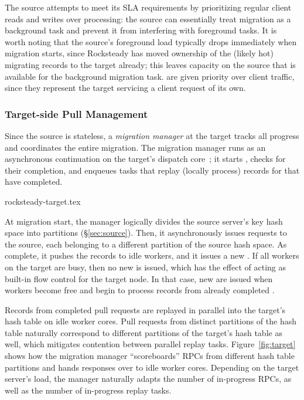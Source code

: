 The source attempts to meet its SLA requirements by prioritizing regular client
reads and writes over \pull processing: the source can essentially treat
migration as a background task and prevent it from interfering with foreground
tasks. It is worth noting that the source's foreground load typically drops
immediately when migration starts, since Rocksteady has moved
ownership of the (likely hot) migrating records to the target already; this
leaves capacity on the source that is available for the background migration
task. \priopulls are given priority over client traffic, since they
represent the target servicing a client request of its own.


\subsubsection{Target-side Pull Management}

Since the source is stateless, a {\em migration manager} at the target tracks
all progress and coordinates the entire migration.  The migration manager runs
as an asynchronous continuation on the target's dispatch
core~\cite{stutsman:dcft}; it starts \pulls, checks for their
completion, and enqueues tasks that replay (locally process) records for \pulls
that have completed.

 {rocksteady-target.tex}

At migration start, the manager logically divides the source server's key hash
space into partitions (\S\ref{sec:source}).  Then, it asynchronously issues
\pull requests to the source, each belonging to a different partition of the
source hash space. As \pulls complete, it pushes the records to idle workers,
and it issues a new \pull. If all workers on the target are busy, then
no new \pull is issued, which has the effect of acting as built-in flow control
for the target node. In that case, new \pulls are issued when workers become
free and begin to process records from already completed \pulls.

Records from completed pull requests are replayed in parallel into the
target's hash table on idle worker cores.  Pull requests from distinct
partitions of the hash table naturally correspond to different partitions of
the target's hash table as well, which mitigates contention between parallel
replay tasks.
Figure~\ref{fig:target} shows how the
migration manager ``scoreboards'' \pull RPCs from different hash table partitions and
hands responses over to idle worker cores.
Depending on the target server's load, the manager naturally
adapts the number of in-progress \pull RPCs, as well as the number of
in-progress replay tasks.

